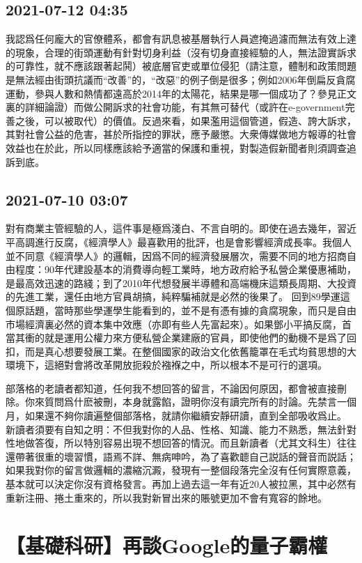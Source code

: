 \documentclass[twocolumn]{ctexart}
\begin{document}
\subsection*{2021-07-12 04:35}

我認爲任何龐大的官僚體系，都會有訊息被基層執行人員遮掩過濾而無法有效上達的現象，合理的街頭運動有針對切身利益（沒有切身直接經驗的人，無法證實訴求的可靠性，就不應該跟著起鬨）被底層官吏或單位侵犯（請注意，體制和政策問題是無法經由街頭抗議而“改善”的，“改惡”的例子倒是很多；例如2006年倒扁反貪腐運動，參與人數和熱情都遠高於2014年的太陽花，結果是哪一個成功了？參見正文裏的詳細論證）而做公開訴求的社會功能，有其無可替代（或許在e-government完善之後，可以被取代）的價值。反過來看，如果濫用這個管道，假造、誇大訴求，其對社會公益的危害，甚於所指控的罪狀，應予嚴懲。大衆傳媒做地方報導的社會效益也在於此，所以同樣應該給予適當的保護和重視，對製造假新聞者則須調查追訴到底。
\subsection*{2021-07-10 03:07}

對有商業主管經驗的人，這件事是極爲淺白、不言自明的。即使在過去幾年，習近平高調進行反腐，《經濟學人》最喜歡用的批評，也是會影響經濟成長率。我個人並不同意《經濟學人》的邏輯，因爲不同的經濟發展層次，需要不同的地方招商自由程度：90年代建設基本的消費導向輕工業時，地方政府給予私營企業優惠補助，是最高效迅速的路綫；到了2010年代想發展半導體和高端機床這類長周期、大投資的先進工業，還任由地方官員胡搞，純粹騙補就是必然的後果了。
回到89學運這個原話題，當時那些學運學生能看到的，並不是有憑有據的貪腐現象，而只是自由市場經濟裏必然的資本集中效應（亦即有些人先富起來）。如果鄧小平搞反腐，首當其衝的就是運用公權力來方便私營企業建廠的官員，即使他們的動機不是爲了回扣，而是真心想要發展工業。在整個國家的政治文化依舊籠罩在毛式均貧思想的大環境下，這絕對會將改革開放扼殺於襁褓之中，所以根本不是可行的選項。

部落格的老讀者都知道，任何我不想回答的留言，不論因何原因，都會被直接刪除。你來質問爲什麽被刪，本身就露餡，證明你沒有讀完所有的討論。先禁言一個月，如果還不夠你讀遍整個部落格，就請你繼續安靜研讀，直到全部吸收爲止。
新讀者須要有自知之明：不但我對你的人品、性格、知識、能力不熟悉，無法針對性地做答復，所以特別容易出現不想回答的情況。而且新讀者（尤其文科生）往往還帶著很重的壞習慣，語焉不詳、無病呻吟，為了喜歡聼自己説話的聲音而説話；如果我對你的留言做邏輯的濃縮沉澱，發現有一整個段落完全沒有任何實際意義，基本就可以決定你沒有資格發言。再加上過去這一年有近20人被拉黑，其中必然有重新注冊、捲土重來的，所以我對新冒出來的賬號更加不會有寬容的餘地。
\section*{【基礎科研】再談Google的量子霸權}
\end{document}
